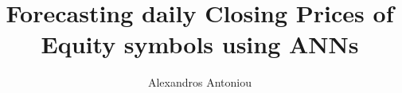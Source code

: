 \author{Alexandros Antoniou}
\title{\bfseries Forecasting daily Closing Prices of Equity symbols using ANNs}
